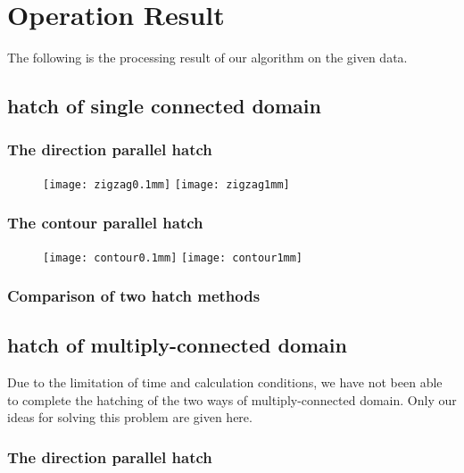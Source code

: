 \documentclass{apmcmthesis}
\begin{document}
\section{Operation Result}
The following is the processing result of our algorithm on the given data.

\subsection{hatch of single connected domain}


\subsubsection{The direction parallel hatch}


\begin{figure}[!ht]
  \centering
  \texttt{[image: zigzag0.1mm]} \quad \texttt{[image: zigzag1mm]}
  \caption{}
  \caption{}
\end{figure}



\subsubsection{The contour parallel hatch}


\begin{figure}[!ht]
  \centering
  \texttt{[image: contour0.1mm]} \quad \texttt{[image: contour1mm]}
  \caption{}
  \caption{}
\end{figure}

\subsubsection{Comparison of two hatch methods}

\subsection{hatch of multiply-connected domain}

Due to the limitation of time and calculation conditions, we have not been able to complete the hatching of the two ways of multiply-connected domain. Only our ideas for solving this problem are given here.

\subsubsection{The direction parallel hatch}
\end{document}

